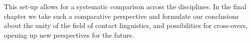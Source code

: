 This set-up allows for a systematic comparison across the disciplines. In the final chapter we take such a comparative perspective and formulate our conclusions about the unity of the field of contact linguistics, and possibilities for cross-overs, opening up new perspectives for the future.

\printbibliography[heading=subbibliography,notkeyword=this]


